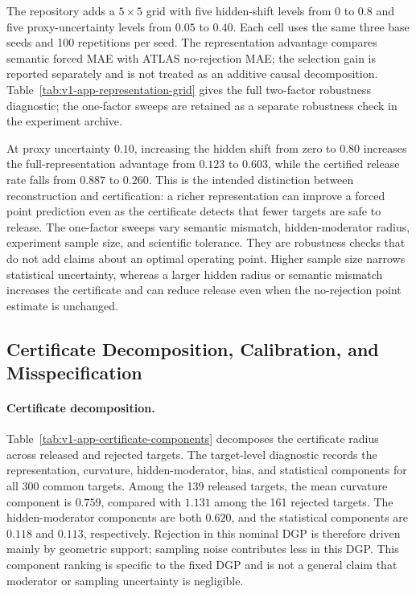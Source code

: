 \documentclass[11pt]{article}
\numberwithin{equation}{section}
\newcommand{\1}{\mathbf 1}
\begin{document}
The repository adds a $5\times5$ grid with five hidden-shift levels from $0$ to $0.8$ and five proxy-uncertainty levels from $0.05$ to $0.40$.  Each cell uses the same three base seeds and 100 repetitions per seed.  The representation advantage compares semantic forced MAE with ATLAS no-rejection MAE; the selection gain is reported separately and is not treated as an additive causal decomposition. Table~\ref{tab:v1-app-representation-grid} gives the full two-factor robustness diagnostic; the one-factor sweeps are retained as a separate robustness check in the experiment archive.



At proxy uncertainty $0.10$, increasing the hidden shift from zero to $0.80$ increases the full-representation advantage from $0.123$ to $0.603$, while the certified release rate falls from $0.887$ to $0.260$.  This is the intended distinction between reconstruction and certification: a richer representation can improve a forced point prediction even as the certificate detects that fewer targets are safe to release.  The one-factor sweeps vary semantic mismatch, hidden-moderator radius, experiment sample size, and scientific tolerance.  They are robustness checks that do not add claims about an optimal operating point.  Higher sample size narrows statistical uncertainty, whereas a larger hidden radius or semantic mismatch increases the certificate and can reduce release even when the no-rejection point estimate is unchanged.


\subsection{Certificate Decomposition, Calibration, and Misspecification}
\label{app:certificate-calibration}
\suppressfloats[t]

\paragraph{Certificate decomposition.}
Table~\ref{tab:v1-app-certificate-components} decomposes the certificate radius across released and rejected targets.
The target-level diagnostic records the representation, curvature, hidden-moderator, bias, and statistical components for all 300 common targets.  Among the 139 released targets, the mean curvature component is $0.759$, compared with $1.131$ among the 161 rejected targets.  The hidden-moderator components are both $0.620$, and the statistical components are $0.118$ and $0.113$, respectively.  Rejection in this nominal DGP is therefore driven mainly by geometric support; sampling noise contributes less in this DGP.  This component ranking is specific to the fixed DGP and is not a general claim that moderator or sampling uncertainty is negligible.
\end{document}

